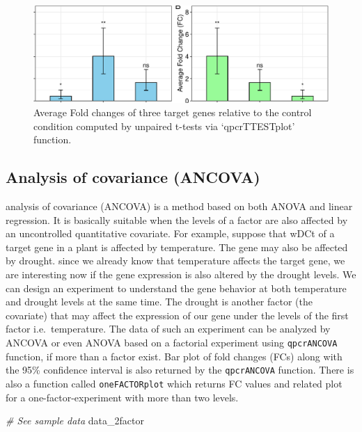 \documentclass[
]{article}
\newenvironment{Shaded}{\begin{snugshade}}{\end{snugshade}}
\newcommand{\CommentTok}[1]{\textcolor[rgb]{0.56,0.35,0.01}{\textit{#1}}}
\newcommand{\NormalTok}[1]{#1}
\begin{document}
\begin{figure}

{\centering \includegraphics{vignette_files/figure-latex/unnamed-chunk-7-1} 

}

\caption{Average Fold changes of three target genes relative to the control condition computed by unpaired t-tests via ‘qpcrTTESTplot’ function.}\label{fig:unnamed-chunk-7}
\end{figure}

\hypertarget{analysis-of-covariance-ancova}{%
\subsection{Analysis of covariance
(ANCOVA)}\label{analysis-of-covariance-ancova}}

analysis of covariance (ANCOVA) is a method based on both ANOVA and
linear regression. It is basically suitable when the levels of a factor
are also affected by an uncontrolled quantitative covariate. For
example, suppose that wDCt of a target gene in a plant is affected by
temperature. The gene may also be affected by drought. since we already
know that temperature affects the target gene, we are interesting now if
the gene expression is also altered by the drought levels. We can design
an experiment to understand the gene behavior at both temperature and
drought levels at the same time. The drought is another factor (the
covariate) that may affect the expression of our gene under the levels
of the first factor i.e.~temperature. The data of such an experiment can
be analyzed by ANCOVA or even ANOVA based on a factorial experiment
using \texttt{qpcrANCOVA} function, if more than a factor exist. Bar
plot of fold changes (FCs) along with the 95\% confidence interval is
also returned by the \texttt{qpcrANCOVA} function. There is also a
function called \texttt{oneFACTORplot} which returns FC values and
related plot for a one-factor-experiment with more than two levels.

\begin{Shaded}
\begin{Highlighting}[]
\CommentTok{\# See sample data}
\NormalTok{data\_2factor}
\end{Highlighting}
\end{Shaded}
\end{document}
